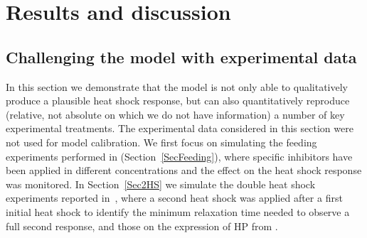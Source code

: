 \documentclass[oneside, 10pt, a4paper, twocolumn]{article}
\begin{document}
\section{Results and discussion}

\subsection{Challenging the model with experimental data}
\label{SectionExperiments}

In this section we demonstrate that the model is not only able to qualitatively
produce a plausible heat shock response, but can also quantitatively reproduce (relative, not absolute on which we do not have information) a number of key experimental treatments. 
The experimental data considered in this section were not used for model
calibration. 
We first focus on simulating the feeding experiments performed in \cite{Schmollinger2013} (Section~\ref{SecFeeding}),
where specific inhibitors have been applied in different concentrations and the
effect on the heat shock response was monitored.
In Section~\ref{Sec2HS} we simulate the double heat shock experiments reported
in~\cite{Schroda2000}, where a second heat shock was applied after a first initial heat shock
to identify the minimum relaxation time needed to observe a full second response,
and those on the expression of HP from \cite{Muehlhaus2011}.


%


\end{document}
